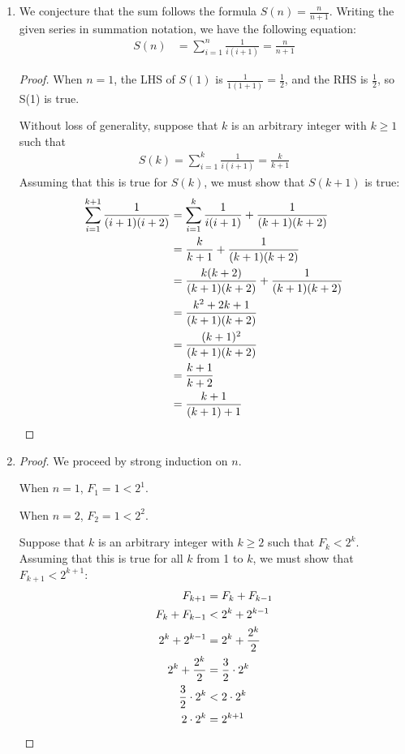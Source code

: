 \documentclass[11pt, notitlepage, leqno]{article}
\begin{document}

\begin{enumerate}

\item We conjecture that the sum follows the formula $S(n)=\frac{n}{n+1}$. Writing the given series in summation notation, we have the following equation:
\begin{align*}
	S(n) &= \sum\limits_{i=1}^n \frac{1}{i (i+1)} = \frac{n}{n+1}
\end{align*}
\begin{proof}
When $n=1$, the LHS of $S(1)$ is $\frac{1}{1 (1+1)} = \frac{1}{2}$, and the RHS is $\frac{1}{2}$, so S(1) is true.

Without loss of generality, suppose that $k$ is an arbitrary integer with $k \geq 1$ such that
\begin{align*}
S(k) = \sum\limits_{i=1}^k \frac{1}{i (i+1)} = \frac{k}{k+1}
\end{align*}
Assuming that this is true for $S(k)$, we must show that $S(k+1)$ is true:
\begin{align*}
\sum\limits_{i=1}^{k+1} \frac{1}{(i+1) (i+2)} &=  \sum\limits_{i=1}^k \frac{1}{i (i+1)} + \frac{1}{(k+1)(k+2)}\\
&= \frac{k}{k+1} + \frac{1}{(k+1)(k+2)}\\
&= \frac{k(k+2)}{(k+1)(k+2)} + \frac{1}{(k+1)(k+2)}\\
&= \frac{k^2 + 2k + 1}{(k+1)(k+2)}\\
&= \frac{(k+1)^2}{(k+1)(k+2)}\\
&= \frac{k+1}{k+2}\\
&= \frac{k+1}{(k+1)+1}\qedhere
\end{align*}
\end{proof}

\item \begin{proof}
We proceed by strong induction on $n$.

When $n=1$, $F_{1} = 1 < 2^{1}$.

When $n=2$, $F_{2} = 1 < 2^2$.

Suppose that $k$ is an arbitrary  integer with $k \geq 2$ such that $F_k < 2^k$. Assuming that this is true for all $k$ from 1 to $k$, we must show that $F_{k+1} < 2^{k+1}$:
\begin{align*}
F_{k+1} &= F_{k} + F_{k-1} \\
F_{k} + F_{k-1} &< 2^k +2^{k-1} \\
2^k +2^{k-1} &= 2^k + \frac{2^k}{2} \\
2^k + \frac{2^k}{2} &= \frac{3}{2} \cdot 2^k \\
\frac{3}{2} \cdot 2^k &< 2 \cdot 2^k \\
2 \cdot 2^k &= 2^{k+1} \qedhere
\end{align*}
\end{proof}


\end{enumerate}
\end{document}
